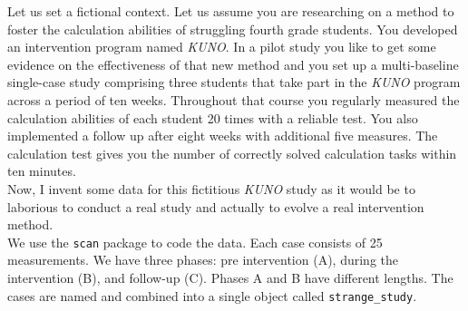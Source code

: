 \documentclass[
]{book}
\begin{document}
Let us set a fictional context. Let us assume you are researching on a method to foster the calculation abilities of struggling fourth grade students. You developed an intervention program named \emph{KUNO}. In a pilot study you like to get some evidence on the effectiveness of that new method and you set up a multi-baseline single-case study comprising three students that take part in the \emph{KUNO} program across a period of ten weeks. Throughout that course you regularly measured the calculation abilities of each student 20 times with a reliable test. You also implemented a follow up after eight weeks with additional five measures. The calculation test gives you the number of correctly solved calculation tasks within ten minutes.\\
Now, I invent some data for this fictitious \emph{KUNO} study as it would be to laborious to conduct a real study and actually to evolve a real intervention method.\\
We use the \texttt{scan} package to code the data. Each case consists of 25 measurements. We have three phases: pre intervention (A), during the intervention (B), and follow-up (C). Phases A and B have different lengths. The cases are named and combined into a single object called \texttt{strange\_study}.
\end{document}
